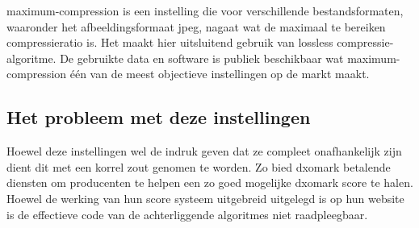 \Gls{maximum-compression} is een instelling die voor verschillende bestandsformaten, waaronder het \gls{afbeeldingsformaat} \gls{jpeg}, nagaat wat de maximaal te bereiken \gls{compressieratio} is. Het maakt hier uitsluitend gebruik van \gls{lossless} \gls{compressie-algoritme}. De gebruikte data en software is publiek beschikbaar wat \Gls{maximum-compression} één van de meest objectieve instellingen op de markt maakt. 

\subsection{Het probleem met deze instellingen}
\label{sec:kwaliteit-instellingen-probleem}

Hoewel deze instellingen wel de indruk geven dat ze compleet onafhankelijk zijn dient dit met een korrel zout genomen te worden. Zo bied \gls{dxomark} betalende diensten om producenten te helpen een zo goed mogelijke \gls{dxomark} score te halen. Hoewel de werking van hun score systeem uitgebreid uitgelegd is op hun website is de effectieve code van de achterliggende algoritmes niet raadpleegbaar.


